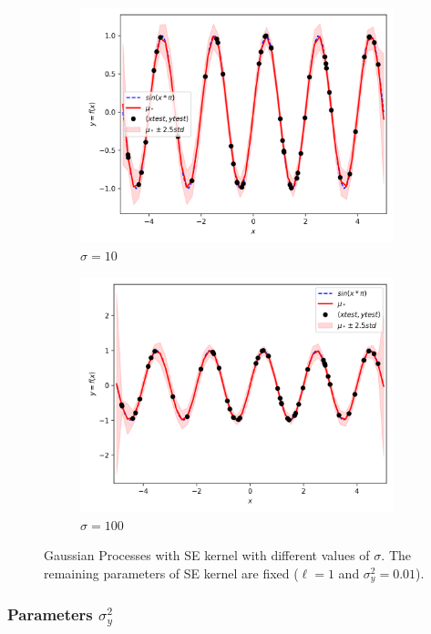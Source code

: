 \documentclass{article}
\begin{document}
\begin{figure}[ht]
\begin{subfigure}{.33\textwidth}
    \includegraphics[width=\linewidth]{kernelSE/s/10.png}
    \caption{$\sigma = 10$}
    \label{fig:s075}
  \end{subfigure}
  \begin{subfigure}{.33\textwidth}
    \centering
    \includegraphics[width=\linewidth]{kernelSE/s/100.png}
    \caption{$\sigma = 100$}
    \label{fig:s1}
  \end{subfigure}
  \caption{Gaussian Processes with SE kernel with different values of $\sigma$. The remaining parameters of SE kernel are fixed ($\ell = 1$ and $\sigma_y^2 = 0.01$).}
  \label{fig:sigma}
\end{figure}

\subsubsection{Parameters $\sigma_y^2$}
\end{document}
